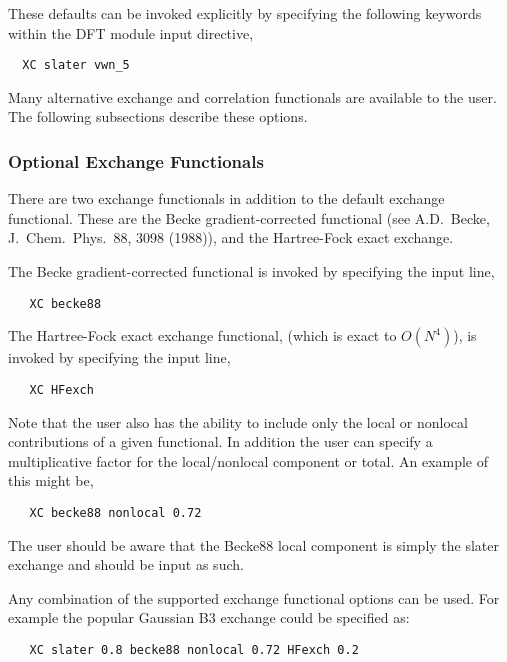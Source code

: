 These defaults can be invoked explicitly by specifying the following
keywords within the DFT module input directive,

\begin{verbatim}
  XC slater vwn_5
\end{verbatim}

Many alternative exchange and correlation functionals are available to
the user.  The following subsections describe these options.

\subsubsection{Optional Exchange Functionals}

There are two exchange functionals in addition to the default exchange
functional.  These are the Becke gradient-corrected functional (see A.D.~Becke, 
J.~Chem.~Phys.~88, 3098 (1988)), and the Hartree-Fock exact exchange.

The Becke gradient-corrected functional is invoked by specifying the input
line,

\begin{verbatim}
   XC becke88
\end{verbatim}

The Hartree-Fock exact exchange functional, (which is exact to $O(N^4)$),
is invoked by specifying the input line,

\begin{verbatim}
   XC HFexch
\end{verbatim}

Note that the user also has the ability to include only the local or
nonlocal contributions of a given functional.  In addition the user
can specify a multiplicative factor for the local/nonlocal component
or total.  An example of this might be,

\begin{verbatim}
   XC becke88 nonlocal 0.72
\end{verbatim}

The user should be aware that the Becke88 local component is simply
the slater exchange and should be input as such.

Any combination of the supported exchange functional options can be
used.  For example the popular Gaussian B3 exchange could be specified
as:

\begin{verbatim}
   XC slater 0.8 becke88 nonlocal 0.72 HFexch 0.2
\end{verbatim}

